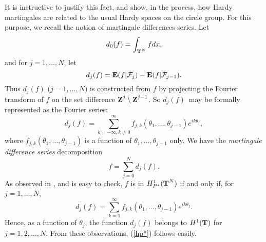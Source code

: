 It is instructive to justify this fact,
and show, in the process,
how Hardy martingales are related to the usual 
Hardy spaces on the circle group.
For this purpose, we recall the notion 
of martingale differences series.
Let
\begin{equation}
d_0(f)=\int_{\T^N} fdx,
\label{d0}
\end{equation}
and for $j=1,\ldots, N$, let
$$d_j(f)=\E(f|\cF_j)-\E(f|\cF_{j-1}).$$
Thus $d_j (f)$ ($j=1,\ldots,N$)
is constructed from $f$ by projecting the Fourier transform
of $f$ on the set difference $\Z^j\setminus \Z^{j-1}$.
So
$d_j(f)$\ may be formally represented
as the Fourier series:
\begin{equation}
d_j(f)=\sum_{k=-\infty,k\neq 0}^\infty 
f_{j,k}(\theta_1,\ldots,\theta_{j-1})
e^{i k \theta_j}, 
\label{dj1}
\end{equation}
 where $ f_{j,k}(\theta_1,\ldots,\theta_{j-1})$ is a function 
 of $\theta_1,\ldots,\theta_{j-1}$ only. 
 We have the {\em martingale difference series}
decomposition
\begin{equation}
f=\sum_{j=0}^N d_j(f).
\label{martingale-difference}
\end{equation}
As observed in \cite{gar}, and is easy to check,
$f$ is in $H^1_{P^*}(\T^N)$ if and only if,
for $j=1,\ldots,N$,
\begin{equation}
d_j(f)=\sum_{k=1}^\infty f_{j,k}(\theta_1,\ldots,\theta_{j-1})
e^{i k \theta_j}. 
\label{dj}
\end{equation}
 Hence, as a function of $\theta_j$, the 
 function $d_j(f)$ belongs to $H^1(\T)$ for $j=1,2,\ldots,N$.
 From these observations, (\ref{hp*}) 
follows easily.  

